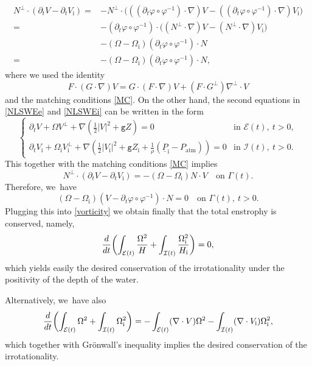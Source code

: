 \documentclass[11pt]{article}
\newcommand{\gr}{{\mathtt g}}
\newcommand{\dt}{\partial_t}
\newcommand{\cI}{{\mathcal I}}
\newcommand{\cE}{{\mathcal E}}
\newcommand{\ul}[1]{\underline{#1}}
\newcommand{\itGamma}{\mathit{\Gamma}}
\theoremstyle{definition}
\begin{document}
\begin{align*}
N^\perp\cdot(\dt V - \dt V_\mathrm{i})
=& -N^\perp\cdot\bigl(((\dt\varphi \circ \varphi^{-1})\cdot\nabla)V
- ((\dt\varphi \circ \varphi^{-1})\cdot\nabla)V_\mathrm{i} \bigr) \\
=& -(\dt\varphi \circ \varphi^{-1})\cdot\bigl((N^\perp\cdot\nabla)V - (N^\perp\cdot\nabla)V_\mathrm{i} \bigr)\\
& - (\Omega - \Omega_\mathrm{i})(\dt\varphi \circ \varphi^{-1}) \cdot N \\
=& - (\Omega - \Omega_\mathrm{i})(\dt\varphi \circ \varphi^{-1}) \cdot N,
\end{align*}
where we used the identity
\begin{equation}\label{F1}
F \cdot (G\cdot\nabla)V = G \cdot (F\cdot\nabla)V + (F\cdot G^\perp)\nabla^\perp \cdot V
\end{equation}
and the matching conditions \eqref{MC}.
On the other hand, the second equations in \eqref{NLSWEe} and \eqref{NLSWEi} can be written in the form
\[
\begin{cases}
\dt V + \Omega V^\perp + \nabla(\frac12|V|^2 + \gr Z) = 0 & \text{in } \cE(t), \ t>0, \\
\dt V_\mathrm{i} + \Omega_\mathrm{i} V_\mathrm{i}^\perp
+ \nabla(\frac12|V_\mathrm{i}|^2 + \gr Z_\mathrm{i} + \frac{1}{\rho}(\ul{P}_\mathrm{i}-P_\mathrm{atm})) = 0 & \text{in } \cI(t), \ t>0.
\end{cases}
\]
This together with the matching conditions \eqref{MC} implies
\[
N^\perp\cdot(\dt V - \dt V_\mathrm{i})=-(\Omega-\Omega_\mathrm{i})N\cdot V\quad\text{on }\itGamma(t).
\]
Therefore, we~have
\[
(\Omega - \Omega_\mathrm{i})(V - \dt\varphi \circ \varphi^{-1})\cdot N = 0 \quad\text{on } \itGamma(t), \ t>0.
\]
Plugging this into \eqref{vorticity} we obtain finally that the total enstrophy is conserved, namely,
\[
\frac{\rm d}{{\rm d}t}\biggl(\int_{\cE(t)}\frac{\Omega^2}{H} + \int_{\cI(t)}\frac{\Omega_\mathrm{i}^2}{H_\mathrm{i}} \biggr) = 0,
\]
which yields easily the desired conservation of the irrotationality under the positivity of the depth of the water.

Alternatively, we~have also
\[
\frac{\rm d}{{\rm d}t}\biggl(\int_{\cE(t)}\Omega^2 + \int_{\cI(t)}\Omega_\mathrm{i}^2\biggr)
= - \int_{\cE(t)}(\nabla\cdot V)\Omega^2 - \int_{\cI(t)}(\nabla\cdot V_\mathrm{i})\Omega_\mathrm{i}^2,
\]
which together with Grönwall's inequality implies the desired conservation of the irrotationality.
\end{document}
